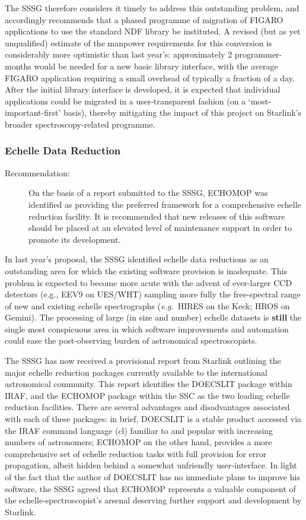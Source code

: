 The SSSG therefore considers it timely to address this outstanding
problem, and accordingly recommends that a phased programme of
migration of FIGARO applications to use the standard NDF library be
instituted. A revised (but as yet unqualified) estimate of the
manpower requirements for this conversion is considerably more
optimistic than last year's: approximately 2 programmer-months would
be needed for a new basic library interface, with the average FIGARO
application requiring a small overhead of typically a fraction of a
day.  After the initial library interface is developed, it is expected
that individual applications could be migrated in a user-transparent
fashion (on a `most-important-first' basis), thereby mitigating the
impact of this project on Starlink's broader spectroscopy-related
programme.

\subsubsection{Echelle Data Reduction}

\begin{description}
\item[Recommendation:]
On the basis of a report submitted to the SSSG, ECHOMOP was identified
as providing the preferred framework for a comprehensive echelle
reduction facility.  It is recommended that new releases of this
software should be placed at an elevated level of maintenance support
in order to promote its development.
\end{description}

In last year's proposal, the SSSG identified echelle data reductions
as an outstanding area for which the existing software provision is
inadequate.  This problem is expected to become more acute with the
advent of ever-larger CCD detectors (e.g., EEV9 on UES/WHT) sampling
more fully the free-spectral range of new and existing echelle
spectrographs ({\em e.g.}\ HIRES on the Keck; HROS on Gemini).  The
processing of large (in size and number) echelle datasets is {\bf
still} the single most conspicuous area in which software improvements
and automation could ease the post-observing burden of astronomical
spectroscopists.

The SSSG has now received a provisional report from Starlink outlining
the major echelle reduction packages currently available to the
international astronomical community.  This report identifies the
DOECSLIT package within IRAF, and the ECHOMOP package within the SSC
as the two leading echelle reduction facilities.  There are several
advantages and disadvantages associated with each of these packages:
in brief, DOECSLIT is a stable product accessed via the IRAF command
language (cl) familiar to and popular with increasing numbers of
astronomers; ECHOMOP on the other hand, provides a more comprehensive
set of echelle reduction tasks with full provision for error
propagation, albeit hidden behind a somewhat unfriendly
user-interface.  In light of the fact that the author of DOECSLIT has
no immediate plans to improve his software, the SSSG agreed that
ECHOMOP represents a valuable component of the
echelle-spectroscopist's arsenal deserving further support and
development by Starlink.

